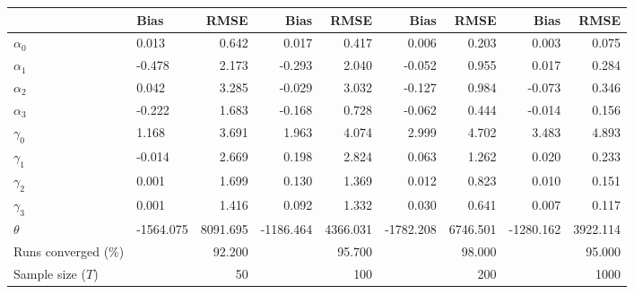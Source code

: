 
\begin{tabular}[t]{llrrrrrrr}
\toprule
  & Bias & RMSE & Bias & RMSE & Bias & RMSE & Bias & RMSE\\
\midrule
$\alpha_{0}$ & 0.013 & 0.642 & 0.017 & 0.417 & 0.006 & 0.203 & 0.003 & 0.075\\
$\alpha_{1}$ & -0.478 & 2.173 & -0.293 & 2.040 & -0.052 & 0.955 & 0.017 & 0.284\\
$\alpha_{2}$ & 0.042 & 3.285 & -0.029 & 3.032 & -0.127 & 0.984 & -0.073 & 0.346\\
$\alpha_{3}$ & -0.222 & 1.683 & -0.168 & 0.728 & -0.062 & 0.444 & -0.014 & 0.156\\
$\gamma_{0}$ & 1.168 & 3.691 & 1.963 & 4.074 & 2.999 & 4.702 & 3.483 & 4.893\\
$\gamma_{1}$ & -0.014 & 2.669 & 0.198 & 2.824 & 0.063 & 1.262 & 0.020 & 0.233\\
$\gamma_{2}$ & 0.001 & 1.699 & 0.130 & 1.369 & 0.012 & 0.823 & 0.010 & 0.151\\
$\gamma_{3}$ & 0.001 & 1.416 & 0.092 & 1.332 & 0.030 & 0.641 & 0.007 & 0.117\\
$\theta$ & -1564.075 & 8091.695 & -1186.464 & 4366.031 & -1782.208 & 6746.501 & -1280.162 & 3922.114\\
Runs converged (\%) &  & 92.200 &  & 95.700 &  & 98.000 &  & 95.000\\
Sample size ($T$) &  & 50 &  & 100 &  & 200 &  & 1000\\
\bottomrule
\end{tabular}
